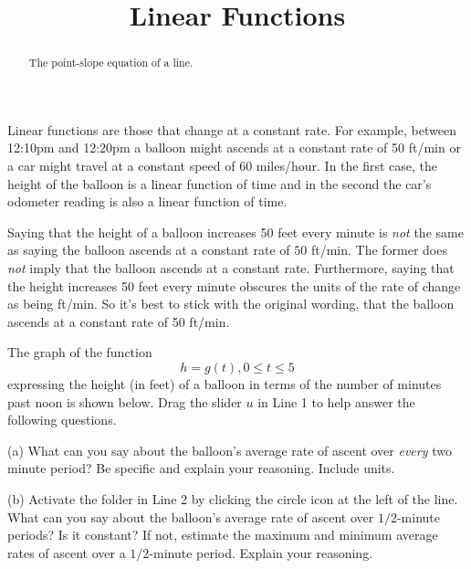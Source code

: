 \documentclass{ximera}
\title{Linear Functions}
\begin{document}
\begin{abstract}
The point-slope equation of a line.
\end{abstract}
\maketitle

Linear functions are those that change at a constant rate. For example, between 12:10pm and 12:20pm a balloon might ascends at a constant rate of 50 ft/min or a car might travel at a constant speed of 60 miles/hour. In the first case, the height of the balloon is a linear function of time and in the second the car's odometer reading is also a linear function of time.

Saying that the height of a balloon increases 50 feet every minute is \emph{not} the same as saying the balloon ascends at a constant rate of $50$ ft/min. The former does \emph{not} imply that the balloon ascends at a constant rate. Furthermore, saying that the height increases 50 feet every minute obscures the units of the rate of change as being ft/min. So it's best to stick with the original wording, that the balloon ascends at a constant rate of 50 ft/min.


\begin{question}  \label{Q343rfgg}
The graph of the function
\[
    h = g(t) , 0\leq t \leq 5
\]
expressing the height (in feet) of a balloon in terms of the number of minutes past noon is shown below. Drag the slider $u$ in Line 1 to help answer the following questions.

\begin{freeResponse}
(a) What can you say about the balloon's average rate of ascent over \emph{every} two minute period? Be specific and explain your reasoning. Include units.

(b) Activate the folder in Line 2 by clicking the circle icon at the left of the line. What can you say about the balloon's average rate of ascent over $1/2$-minute periods? Is it constant? If not, estimate the maximum and minimum average rates of ascent over a $1/2$-minute period. Explain your reasoning.
\end{freeResponse}

 
\begin{onlineOnly}
    \begin{center}
\end{center}
\end{onlineOnly}

\end{question}
\end{document}
